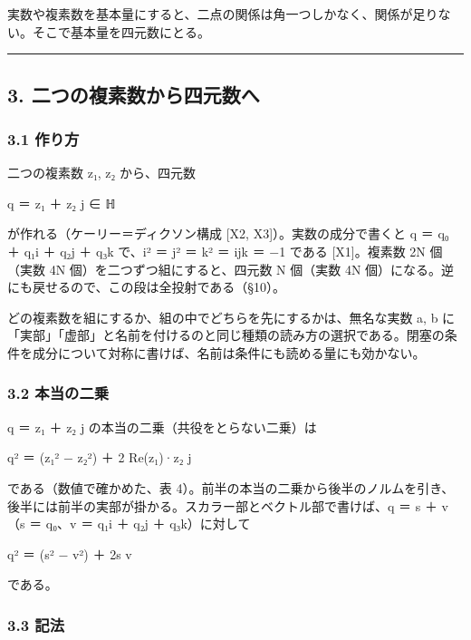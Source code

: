 \documentclass[
  a4paper,
]{ltjsarticle}
\begin{document}
実数や複素数を基本量にすると、二点の関係は角一つしかなく、関係が足りない。そこで基本量を四元数にとる。

\begin{center}\rule{0.5\linewidth}{0.5pt}\end{center}

\subsection{3.
二つの複素数から四元数へ}\label{ux4e8cux3064ux306eux8907ux7d20ux6570ux304bux3089ux56dbux5143ux6570ux3078}

\subsubsection{3.1 作り方}\label{ux4f5cux308aux65b9}

二つの複素数 z₁, z₂ から、四元数

q ＝ z₁ ＋ z₂ j ∈ ℍ

が作れる（ケーリー＝ディクソン構成 {[}X2, X3{]}）。実数の成分で書くと q
＝ q₀ ＋ q₁i ＋ q₂j ＋ q₃k で、i² ＝ j² ＝ k² ＝ ijk ＝ −1 である
{[}X1{]}。複素数 2N 個（実数 4N 個）を二つずつ組にすると、四元数 N
個（実数 4N 個）になる。逆にも戻せるので、この段は全投射である（§10）。

どの複素数を組にするか、組の中でどちらを先にするかは、無名な実数 a, b
に「実部」「虚部」と名前を付けるのと同じ種類の読み方の選択である。閉塞の条件を成分について対称に書けば、名前は条件にも読める量にも効かない。

\subsubsection{3.2 本当の二乗}\label{ux672cux5f53ux306eux4e8cux4e57}

q ＝ z₁ ＋ z₂ j の本当の二乗（共役をとらない二乗）は

q² ＝ (z₁² − \textbar z₂\textbar²) ＋ 2 Re(z₁)·z₂ j

である（数値で確かめた、表
4）。前半の本当の二乗から後半のノルムを引き、後半には前半の実部が掛かる。スカラー部とベクトル部で書けば、q
＝ s ＋ v（s ＝ q₀、v ＝ q₁i ＋ q₂j ＋ q₃k）に対して

q² ＝ (s² − \textbar v\textbar²) ＋ 2s v

である。

\subsubsection{3.3 記法}\label{ux8a18ux6cd5}
\end{document}
